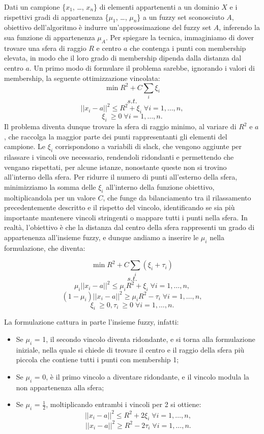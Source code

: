 \documentclass[12pt,a4paper]{report}
\begin{document}
Dati un campione  \{$x_1$, \dots , $x_n$\} di elementi appartenenti a un dominio $X$ e i rispettivi gradi di appartenenza  \{$\mu_1$, \dots , $\mu_n$\}  a un fuzzy set sconosciuto $A$, obiettivo dell'algoritmo è indurre un'approssimazione del fuzzy set $A$,  inferendo la sua funzione di appartenenza $\mu_A$. Per spiegare la tecnica, immaginiamo di dover trovare una sfera di raggio $R$  e centro $a$  che contenga i punti con membership elevata, in modo che il loro  grado di membership dipenda dalla distanza dal centro $a$.
Un primo modo di formulare il problema sarebbe, ignorando i valori di membership, la seguente ottimizzazione vincolata:
\[ \min R^2 + C\sum_{i} \xi_{i}\]
\[s.t.\]
\[||x_i - a||^2  \leq R^2 + \xi_{i} \; \forall i = 1, \dots, n,\]
\[ \xi_{i}\ \geq 0 \; \forall i = 1, \dots, n.\]
Il problema diventa dunque trovare la sfera di raggio minimo, al variare di $R^2$ e $a$, che raccolga la maggior parte dei punti rappresentanti gli elementi del campione.  
Le $\xi_i$ corrispondono a variabili di slack, che vengono aggiunte per rilassare i vincoli ove necessario, rendendoli ridondanti e permettendo che vengano rispettati, per alcune istanze, nonostante queste non si trovino all'interno della sfera. Per ridurre il numero di punti all'esterno della sfera, minimizziamo la somma delle $\xi_i$ all'interno della funzione obiettivo, moltiplicandola per un valore $C$, che funge da bilanciamento tra il rilassamento precedentemente descritto e il rispetto del vincolo, identificando se sia più importante mantenere vincoli stringenti o mappare tutti i punti nella sfera.
In realtà, l'obiettivo è che la distanza dal centro della sfera rappresenti un grado di appartenenza all'insieme fuzzy, e dunque andiamo a inserire le $\mu_i$ nella formulazione, che diventa:

\[\min R^2 + C\sum_{i} (\xi_{i} + \tau_{i})\]
\[s.t.\]
\[ \mu_i||x_i - a||^2  \leq \mu_i R^2 + \xi_{i} \; \forall i = 1, \dots, n,\]
\[ (1 - \mu_i)||x_i - a||^2  \geq \mu_i R^2 - \tau_{i}  \; \forall i = 1, \dots, n,\]
\[ \xi_{i}\ \geq 0, \tau_{i}\ \geq 0  \; \forall i = 1, \dots, n.\]

La formulazione cattura in parte l'insieme fuzzy, infatti:
\begin{itemize}
  \item Se  $\mu_i$ = 1, il secondo vincolo diventa ridondante, e si torna alla formulazione iniziale, nella quale si chiede di trovare il centro  e il raggio della sfera più piccola che contiene tutti i punti con membership 1;
  \item Se   $\mu_i$ = 0, è il primo vincolo a diventare ridondante, e il vincolo modula la non appartenenza alla sfera;		
  \item Se   $\mu_i$ = $\frac{1}{2}$, moltiplicando entrambi i vincoli per 2 si ottiene:
\[ ||x_i - a||^2  \leq R^2 + 2\xi_{i} \; \forall i = 1, \dots, n,\]
\[ ||x_i - a||^2  \geq R^2 - 2\tau_{i}\; \forall i = 1, \dots, n.\]
\end{itemize}
\end{document}
